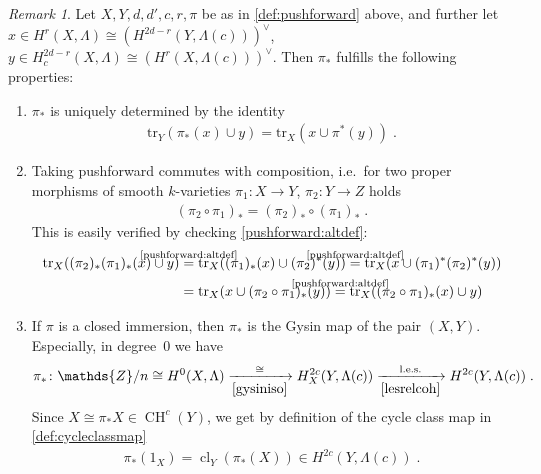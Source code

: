 \documentclass[english]{scrartcl}
\theoremstyle{definition}
\theoremstyle{remark}
\newtheorem{Rem}[Def]{Remark}
\newcommand*{\Z}{\mathds{Z}}
\newcommand*{\Zmod}[1]{\Z/#1} %
\newcommand*{\idest}{i.e.\ }
\newcommand*{\Tr}{\text{tr}} %
\DeclareMathOperator{\CH}{CH} %
\DeclareMathOperator{\CL}{cl} %
\newcommand*{\cl}[2]{{\CL_{#1}\left(#2\right)}} %
\newcommand*{\one}[1]{{1_{#1}}}%
\begin{document}
\begin{Rem}\label{proppushforward}
  Let $X,Y,d,d',c,r,\pi$ be as in \ref{def:pushforward} above,
  and further let
  $x\in H^r(X,\Lambda)\cong \left(H^{2d-r}(Y,\Lambda(c))\right)^\vee$,
  $y\in H_c^{2d-r}(X,\Lambda)\cong
  \left(H^{r}(X,\Lambda(c))\right)^\vee$.
  Then $\pi_*$ fulfills the following properties:
  \begin{enumerate}[label=(P\arabic*)]
  \item\label{pushforward:altdef}
    $\pi_*$ is uniquely determined by the identity
    \begin{gather*}
      \Tr_{Y}\left(\pi_*(x)\cup y\right) =
      \Tr_{X}\left(x\cup\pi^*(y)\right)
      \;.
    \end{gather*}
  \item\label{pushforward:composition}
    Taking pushforward commutes with composition, \idest for two
    proper morphisms of smooth $k$-varieties
    $\pi_1\colon X\to Y$, $\pi_2\colon Y\to Z$ holds
    \begin{gather*}
      (\pi_2\circ \pi_1)_* = (\pi_2)_*\circ(\pi_1)_*\;.
    \end{gather*}
    This is easily verified by checking \ref{pushforward:altdef}:
    \begin{align*}
      \Tr_X((\pi_2)_*(\pi_1)_*(x) \cup y)
      &\overset{\mathclap{\text{\ref{pushforward:altdef}}}}=
        \Tr_X((\pi_1)_*(x) \cup (\pi_2)^*(y))
      \overset{\mathclap{\text{\ref{pushforward:altdef}}}}=
        \Tr_X(x \cup (\pi_1)^*(\pi_2)^*(y))\\
      &=\Tr_X(x \cup (\pi_2\circ\pi_1)_*(y))
      \overset{\mathclap{\text{\ref{pushforward:altdef}}}}=
        \Tr_X((\pi_2\circ\pi_1)_*(x)\cup y)
    \end{align*}
  \item\label{P3}
    If $\pi$ is a closed immersion, then $\pi_*$ is the Gysin map of
    the pair $(X,Y)$. Especially, in degree~0 we have
    \begin{align*}
      \pi_*\colon
      \Zmod{n}\cong H^{0}(X,\Lambda)
      \xrightarrow[\ref{gysiniso}]{\cong}
      H_X^{2c}(Y,\Lambda(c))
      \xrightarrow[\ref{lesrelcoh}]{\text{l.e.s.}}
      H^{2c}(Y,\Lambda(c))
      \;.
    \end{align*}
    Since $X\cong\pi_*X\in\CH^{c}(Y)$, we get by definition of
    the cycle class map in \ref{def:cycleclassmap}
    \begin{gather*}
      \pi_*(\one{X})=\cl{Y}{\pi_*(X)}\in H^{2c}(Y,\Lambda(c))\;.
    \end{gather*}

\end{enumerate}
\end{Rem}
\end{document}
